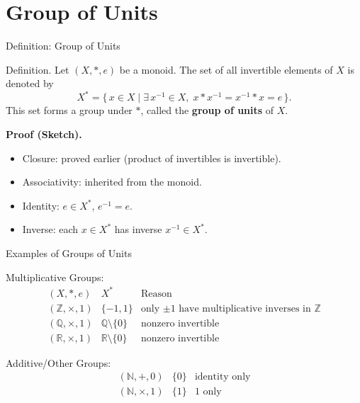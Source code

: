 \documentclass[11pt,aspectratio=43,ignorenonframetext,t]{beamer}
\begin{document}
\section{Group of Units}

\begin{frame}{Definition: Group of Units}
\begin{block}{Definition.}  
Let $(X, *, e)$ be a monoid.  
The set of all invertible elements of $X$ is denoted by
\[
X^* = \{\, x \in X \mid \exists\, x^{-1}\in X,\; x*x^{-1}=x^{-1}*x=e \,\}.
\]
This set forms a group under $*$, called the \textbf{group of units} of $X$.
\end{block}

\textbf{Proof (Sketch).}
\begin{itemize}
  \item Closure: proved earlier (product of invertibles is invertible).
  \item Associativity: inherited from the monoid.
  \item Identity: $e\in X^*$, $e^{-1}=e$.
  \item Inverse: each $x\in X^*$ has inverse $x^{-1}\in X^*$.
\end{itemize}
\end{frame}

\begin{frame}{Examples of Groups of Units}
\begin{block}{Multiplicative Groups:}
\[
\begin{array}{lll}
(X, *, e) & X^* & \text{Reason}\\ \hline
(\mathbb{Z}, \times, 1) & \{-1,1\} & \text{only $\pm1$ have multiplicative inverses in $\mathbb{Z}$} \\
(\mathbb{Q}, \times, 1) & \mathbb{Q}\setminus\{0\} & \text{nonzero invertible} \\
(\mathbb{R}, \times, 1) & \mathbb{R}\setminus\{0\} & \text{nonzero invertible}
\end{array}
\]
\end{block}
\begin{block}{Additive/Other Groups:}
\[
\begin{array}{lll}
(\mathbb{N}, +, 0) & \{0\} & \text{identity only}\\
(\mathbb{N}, \times, 1) & \{1\} & \text{1 only}
\end{array}
\]
\end{block}
\end{frame}
\end{document}

